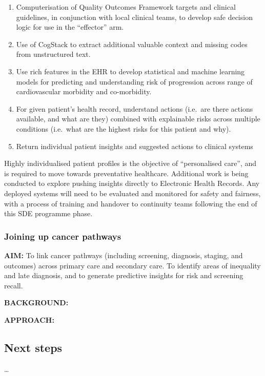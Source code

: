 \documentclass[
  letterpaper,
  DIV=11,
  numbers=noendperiod]{scrartcl}
\begin{document}
\begin{enumerate}
\def\labelenumi{(\arabic{enumi})}
\item
  Computerisation of Quality Outcomes Framework targets and clinical
  guidelines, in conjunction with local clinical teams, to develop safe
  decision logic for use in the ``effector'' arm.
\item
  Use of CogStack to extract additional valuable context and missing
  codes from unstructured text.
\item
  Use rich features in the EHR to develop statistical and machine
  learning models for predicting and understanding risk of progression
  across range of cardiovascular morbidity and co-morbidity.
\item
  For given patient's health record, understand actions (i.e.~are there
  actions available, and what are they) combined with explainable risks
  across multiple conditions (i.e.~what are the highest risks for this
  patient and why).
\item
  Return individual patient insights and suggested actions to clinical
  systems
\end{enumerate}

Highly individualised patient profiles is the objective of
``personalised care'', and is required to move towards preventative
healthcare. Additional work is being conducted to explore pushing
insights directly to Electronic Health Records. Any deployed systems
will need to be evaluated and monitored for safety and fairness, with a
process of training and handover to continuity teams following the end
of this SDE programme phase.

\subsubsection{Joining up cancer
pathways}\label{joining-up-cancer-pathways}

\textbf{AIM:} To link cancer pathways (including screening, diagnosis,
staging, and outcomes) across primary care and secondary care. To
identify areas of inequality and late diagnosis, and to generate
predictive insights for risk and screening recall.

\textbf{BACKGROUND:}

\textbf{APPROACH:}

\subsection{Next steps}\label{next-steps}

\ldots{}
\end{document}
